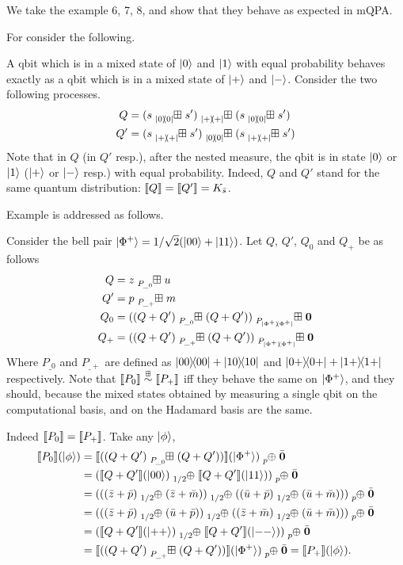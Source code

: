 We take the example 6, 7, 8, and show that they behave as expected in mQPA.

For  consider the following.
\begin{example}
	A qbit which is in a mixed state of $\ket{0}$ and $\ket{1}$ with equal probability behaves exactly as a qbit which is in a mixed state of $\ket{+}$ and $\ket{-}$.
	Consider the two following processes.
	\begin{align*}
		Q &= (s \qsum{\ketbra{0}{0}} s') \qsum{\ketbra{+}{+}} (s \qsum{\ketbra{0}{0}} s')\\
		Q' &= (s \qsum{\ketbra{+}{+}} s') \qsum{\ketbra{0}{0}} (s \qsum{\ketbra{+}{+}} s')
	\end{align*}
	Note that in $Q$ (in $Q'$ resp.), after the nested measure, the qbit is in state $\ket{0}$ or $\ket{1}$ ($\ket{+}$ or $\ket{-}$ resp.) with equal probability.
	Indeed, $Q$ and $Q'$ stand for the same quantum distribution: $\llbracket Q\rrbracket = \llbracket Q'\rrbracket = K_{\bar{s}}$.
\end{example}

Example  is addressed as follows.
\begin{example}
	Consider the bell pair $\ket{\Phi^+} = 1/\sqrt{2}(\ket{00} + \ket{11})$.
	Let $Q$, $Q'$, $Q_0$ and $Q_+$ be as follows
	\begin{align*}
		Q &= z \qsum{P_{\_0}} u\\
		Q' &= p \qsum{P_{\_+}} m\\
		Q_0 &= ((Q + Q') \qsum{P_{\_0}} (Q + Q')) \qsum{P_{\ketbra{\Phi^+}{\Phi^+}}} \nil\\
		Q_+ &= ((Q + Q') \qsum{P_{\_+}} (Q + Q'))  \qsum{P_{\ketbra{\Phi^+}{\Phi^+}}} \nil
	\end{align*}
	Where $P_{\_0}$ and $P_{\_+}$ are defined as $\ket{00}\!\!\bra{00} + \ket{10}\!\!\bra{10}$ and $\ket{0+}\!\!\bra{0+} + \ket{1+}\!\!\bra{1+}$ respectively.
	Note that $\llbracket P_0\rrbracket \stackrel{\scriptscriptstyle \boxplus}{\sim} \llbracket P_+\rrbracket$ iff they behave the same on $\ket{\Phi^+}$, and they should, because the mixed states obtained by measuring a single qbit on the computational basis, and on the Hadamard basis are the same.

	Indeed $\llbracket P_0\rrbracket = \llbracket P_+\rrbracket$.
	Take any $\ket{\phi}$,
		\begin{align*}
		\sem{P_0}(\ket{\phi}) &= 
		\sem{((Q + Q') \qsum{P_{\_0}} (Q + Q'))}(\ket{\Phi^+}) \psum{p} \bar{\nil}\\
		&= (\sem{Q + Q'}(\ket{00}) \psum{1/2} \sem{Q + Q'}(\ket{11})) \psum{p} \bar{\nil}\\
		&= (((\bar{z} + \bar{p}) \psum{1/2} (\bar{z} + \bar{m})) \psum{1/2} ((\bar{u} + \bar{p}) \psum{1/2} (\bar{u} + \bar{m}))) \psum{p} \bar{\nil}\\
		&= (((\bar{z} + \bar{p}) \psum{1/2} (\bar{u} + \bar{p})) \psum{1/2} ((\bar{z} + \bar{m}) \psum{1/2} (\bar{u} + \bar{m}))) \psum{p} \bar{\nil}\\		
		&= (\sem{Q + Q'}(\ket{++}) \psum{1/2} \sem{Q + Q'}(\ket{--})) \psum{p} \bar{\nil}\\
		&= \sem{((Q + Q') \qsum{P_{\_+}} (Q + Q'))}(\ket{\Phi^+}) \psum{p} \bar{\nil} = \sem{P_+}(\ket{\phi}).
		\end{align*}
\end{example}


